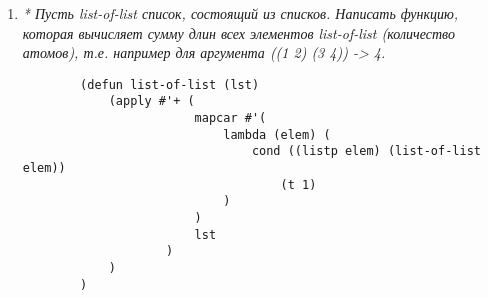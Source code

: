 \begin{enumerate}[wide=0pt]
	\begin{lstlisting}
		(reduce #'+ ()) -> 0
		(reduce #'* ()) -> 1
	\end{lstlisting}

	начальное занчение функции + --- 0

	начальное значение функции * --- 1



	\item  \textit{* Пусть list-of-list список, состоящий из списков. Написать функцию, которая
	вычисляет сумму длин всех элементов list-of-list (количество атомов), т.е. например
	для аргумента
	 ((1 2) (3 4)) -> 4.}

	\begin{lstlisting}
		(defun list-of-list (lst)
			(apply #'+ (
						mapcar #'(
							lambda (elem) (
								cond ((listp elem) (list-of-list elem))
									(t 1)
							)
						)
						lst
					)
			)
		)
	\end{lstlisting}


\end{enumerate}